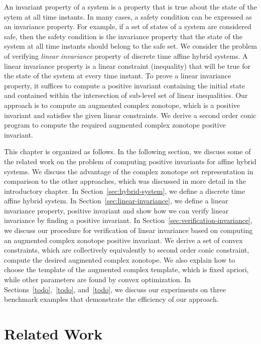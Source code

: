 
An invariant property of a system is a property that is true about the
state of the sytem at all time instants.  In many cases, a
safety condition can be expressed as an invariance property.  For
example, if a set of states of a system are considered safe, then the
safety condition is the invariance property that the state of the
system at all time instants should belong to the safe set.  We
consider the problem of verifying {\it linear invariance} property of
discrete time affine hybrid systems.  A linear invariance property is
a linear constraint (inequality) that will be true for the
state of the system at every time instant.   To prove a linear
invariance property, it suffices to compute a positive invariant
containing the initial state and contained within the intersection of
sub-level set of linear inequalities.  Our approach is to compute an
augmented complex zonotope, which is a positive invariant and
satisfies the given linear constraints.  We derive a second order
conic program to compute the required augmented complex zonotope
positive invariant.

This chapter is organized as follows.  In the following section, we
discuss some of the related work on the problem of computing positive
invariants for affine hybrid systems.  We discuss the advantage of the
complex zonotope set representation in comparison to the other
approaches, which was discussed in more detail in the introductory
chapter.  In Section~\ref{sec:hybrid-system}, we define a discrete time affine
hybrid system.  In Section~\ref{sec:linear-invariance}, we define a linear invariance
property, positive invariant and show how we can verify linear
invariance by finding a positive invariant.  In Section~\ref{sec:verification-invariance}, we
discuss our procedure for verification of linear invariance based on
computing an augmented complex zonotope positive invariant.  We derive
a set of convex constraints, which are collectively equivalently to
second order conic constraint, compute the desired augmented complex
zonotope.  We also explain how to choose the template of the augmented
complex template, which is fixed apriori, while other parameters are
found by convex optimization.  In Sections~\ref{todo},~\ref{todo},
and~\ref{todo}, we discuss our experiments on three benchmark examples
that demonstrate the efficiency of our approach.

\section{Related Work}~\label{sec:invariance-related-work}
  

